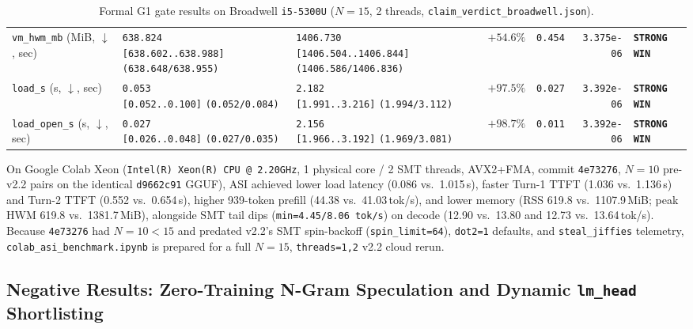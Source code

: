\documentclass[11pt,a4paper]{article}
\begin{document}
\begin{table}[h]
\begin{tabular}{@{}lllrrrl@{}}
\texttt{vm\_hwm\_mb} (MiB, $\downarrow$, sec) & \shortstack[l]{\texttt{638.824}\\\scriptsize\texttt{[638.602..638.988]} \texttt{(638.648/638.955)}} & \shortstack[l]{\texttt{1406.730}\\\scriptsize\texttt{[1406.504..1406.844]} \texttt{(1406.586/1406.836)}} & $+54.6\%$ & \texttt{0.454} & \texttt{3.375e-06} & \textbf{\texttt{STRONG WIN}} \\
\texttt{load\_s} (s, $\downarrow$, sec) & \shortstack[l]{\texttt{0.053}\\\scriptsize\texttt{[0.052..0.100]} \texttt{(0.052/0.084)}} & \shortstack[l]{\texttt{2.182}\\\scriptsize\texttt{[1.991..3.216]} \texttt{(1.994/3.112)}} & $+97.5\%$ & \texttt{0.027} & \texttt{3.392e-06} & \textbf{\texttt{STRONG WIN}} \\
\texttt{load\_open\_s} (s, $\downarrow$, sec) & \shortstack[l]{\texttt{0.027}\\\scriptsize\texttt{[0.026..0.048]} \texttt{(0.027/0.035)}} & \shortstack[l]{\texttt{2.156}\\\scriptsize\texttt{[1.966..3.192]} \texttt{(1.969/3.081)}} & $+98.7\%$ & \texttt{0.011} & \texttt{3.392e-06} & \textbf{\texttt{STRONG WIN}} \\
\bottomrule
\end{tabular}
\caption{Formal G1 gate results on Broadwell \texttt{i5-5300U} ($N=15$, 2 threads, \texttt{claim\_verdict\_broadwell.json}).}
\label{tab:g1_broadwell}
\end{table}

On Google Colab Xeon (\texttt{Intel(R) Xeon(R) CPU @ 2.20GHz}, 1 physical core / 2 SMT threads, AVX2+FMA, commit \texttt{4e73276}, $N=10$ pre-v2.2 pairs on the identical \texttt{d9662c91} GGUF), ASI achieved lower load latency (0.086 vs.\ 1.015\,s), faster Turn-1 TTFT (1.036 vs.\ 1.136\,s) and Turn-2 TTFT (0.552 vs.\ 0.654\,s), higher 939-token prefill (44.38 vs.\ 41.03\,tok/s), and lower memory (RSS 619.8 vs.\ 1107.9\,MiB; peak HWM 619.8 vs.\ 1381.7\,MiB), alongside SMT tail dips (\texttt{min=4.45/8.06\,tok/s}) on decode (12.90 vs.\ 13.80 and 12.73 vs.\ 13.64\,tok/s). Because \texttt{4e73276} had $N=10 < 15$ and predated v2.2's SMT spin-backoff (\texttt{spin\_limit=64}), \texttt{dot2=1} defaults, and \texttt{steal\_jiffies} telemetry, \texttt{colab\_asi\_benchmark.ipynb} is prepared for a full $N=15$, \texttt{threads=1,2} v2.2 cloud rerun.

\subsection{Negative Results: Zero-Training N-Gram Speculation and Dynamic \texttt{lm\_head} Shortlisting}
\label{subsec:neg_spec}
\end{document}
